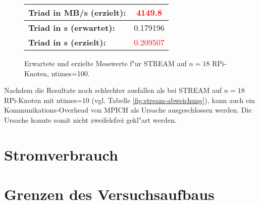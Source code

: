 \begin{enumerate}
\begin{figure}
\begin{tabular}{|l|c|}
    \hline 
    \textbf{Triad in MB/s (erzielt):} & \textcolor{red}{4149.8}\\
    \hline 
    \textbf{Triad in s (erwartet):} & 0.179196\\
    \hline 
    \textbf{Triad in s (erzielt):} & \textcolor{red}{0.209507}\\
    \hline 
  \end{tabular}
  \caption{Erwartete und erzielte Messwerte f"ur STREAM auf $n=18$ RPi-Knoten, ntimes=100.}\label{fig:stream-ntimes100}
\end{figure}
\noindent
Nachdem die Resultate noch schlechter ausfallen als bei STREAM auf $n=18$ RPi-Knoten mit ntimes=10 (vgl. Tabelle \ref{fig:stream-abweichung}), kann auch ein Kommunikations-Overhead von MPICH als Ursache ausgeschlossen werden. Die Ursache konnte somit nicht zweifelsfrei gekl"art werden. 
\end{enumerate}

\section{Stromverbrauch}

\section{Grenzen des Versuchsaufbaus}\label{Grenzen}

